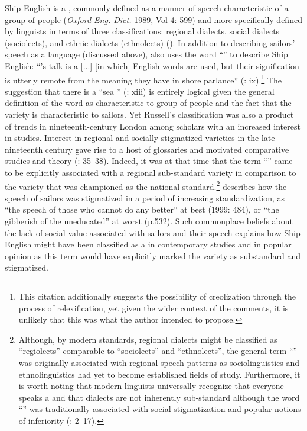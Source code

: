Ship English is a , commonly defined as a manner of speech characteristic of a group of people (\textit{Oxford Eng. Dict.} 1989, Vol 4: 599) and more specifically defined by linguists in terms of three classifications: regional dialects, social dialects (sociolects), and ethnic dialects (ethnolects) (\citealt{WolframSchilling2016}). In addition to describing sailors’ speech as a language (discussed above), \citet{Russell1883} also uses the word “” to describe Ship English: “’s talk is a  [...] [in which] English words are used, but their signification is utterly remote from the meaning they have in shore parlance” (\citealt{Russell1883}: ix).\footnote{This citation additionally suggests the possibility of creolization through the process of relexification, yet given the wider context of the comments, it is unlikely that this was what the author intended to propose.}  The suggestion that there is a “sea ” (\citealt{Russell1883}: xiii) is entirely logical given the general definition of the word as characteristic to group of people and the fact that the variety is characteristic to sailors. Yet Russell’s classification was also a product of trends in nineteenth-century London among scholars with an increased interest in  studies. Interest in regional and socially stigmatized varieties in the late nineteenth century gave rise to a host of  glossaries {and motivated comparative studies and  theory (\citealt{Petyt1980}: 35–38). Indeed, it was at that time that the term “” came to be explicitly associated with a regional sub-standard variety in comparison to the variety that was championed as the national standard.}\footnote{{Although}, by modern standards, regional dialects might be classified as “regiolects” {comparable to “sociolects” and “ethnolects”, the general term “” was originally} associated with regional speech patterns as sociolinguistics and ethnolinguistics had yet to become established fields of study. Furthermore,{ it is worth noting that modern} linguists universally recognize that everyone speaks a  and that dialects are not inherently sub-standard although the word “” was traditionally associated with social stigmatization and popular notions of inferiority (\citealt{WolframSchilling2016}: 2–17).}  \citeauthor{Görlach1999} describes how{ the} speech of sailors was stigmatized in a period of increasing standardization, as “the speech of those who cannot do any better” at best (1999: 484), or “the gibberish of the uneducated” at worst (p.532).{ Such commonplace beliefs about the lack of social value associated with sailors and their speech explains how Ship English might have been classified as a  in contemporary studies and in popular opinion as this term would have explicitly marked the variety as substandard and stigmatized.}

